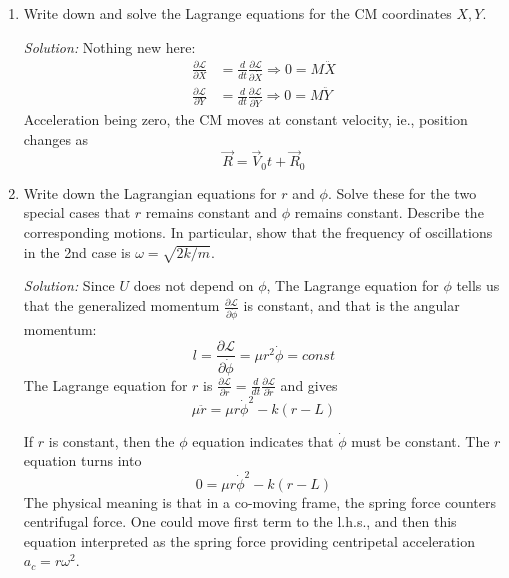 \documentclass[12pt]{article}
\newcommand{\soln}[2] {\textit{Solution:} #2}
\begin{document}
\begin{enumerate}
\begin{enumerate}
{                        }

                  \item Write down and solve the Lagrange equations for the CM coordinates $X, Y$.

                        \soln{12em}
                        {
                              Nothing new here:
                              \begin{align*}
                                    \frac{\partial\mathcal{L}}{\partial X} & = \frac{d}{dt}\frac{\partial\mathcal{L}}{\partial \dot X} \Longrightarrow 0 = M\ddot X \\
                                    \frac{\partial\mathcal{L}}{\partial Y} & = \frac{d}{dt}\frac{\partial\mathcal{L}}{\partial \dot Y} \Longrightarrow 0 = M\ddot Y
                              \end{align*}
                              Acceleration being zero, the CM moves at constant velocity, ie., position changes as
                              $$\vec R = \vec V_0 t + \vec R_0$$
                        }

                  \item Write down the Lagrangian equations for $r$ and $\phi$. Solve these for the two special cases that $r$ remains constant and $\phi$ remains constant. Describe the corresponding motions. In particular, show that the frequency of oscillations in the 2nd case is $\omega = \sqrt{2k/m}$.

                        \soln{12em}
                        {
                              Since $U$ does not depend on $\phi$, The Lagrange equation for $\phi$ tells us that the generalized momentum $\frac{\partial \mathcal{L}}{\partial \dot \phi}$ is constant, and that is the angular momentum:
                              $$l = \frac{\partial \mathcal{L}}{\partial \dot \phi} = \mu r^2 \dot \phi = const$$
                              The Lagrange equation for $r$ is $\frac{\partial\mathcal{L}}{\partial r} = \frac{d}{dt}\frac{\partial\mathcal{L}}{\partial \dot r}$ and gives
                              $$
                                    \mu\ddot r = \mu r \dot\phi^2 - k(r - L)
                              $$

                              If $r$ is constant, then the $\phi$ equation indicates that $\dot\phi$ must be constant. The $r$ equation turns into
                              $$
                                    0 = \mu r \dot\phi^2 - k(r - L)
                              $$
                              The physical meaning is that in a co-moving frame, the spring force counters centrifugal force. One could move first term to the l.h.s., and then this equation interpreted as the spring force providing centripetal acceleration $a_c = r\omega^2$.

}
\end{enumerate}
\end{enumerate}
\end{document}
